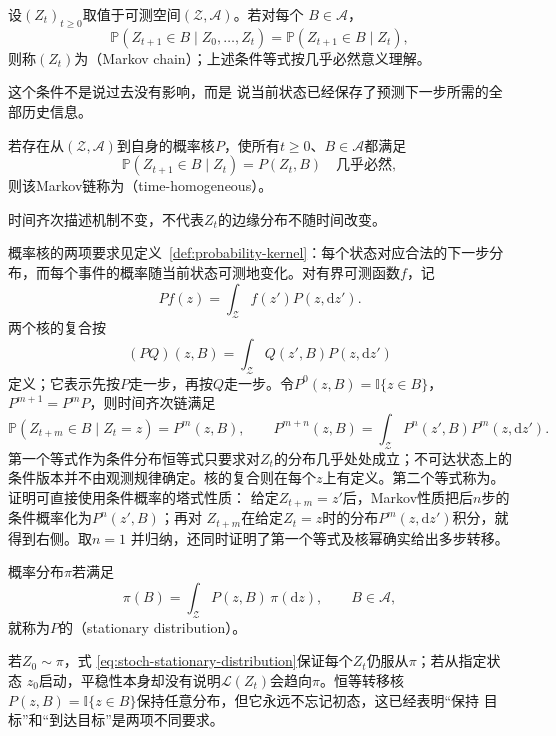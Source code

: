 \begin{definition}[Markov链]
  \label{def:stoch-markov-chain}
设$(Z_t)_{t\geq0}$取值于可测空间$(\mathcal{Z},\mathcal{A})$。若对每个
$B\in\mathcal{A}$，
\[
  \mathbb{P}(Z_{t+1}\in B\mid Z_0,\ldots,Z_t)
  =
  \mathbb{P}(Z_{t+1}\in B\mid Z_t),
\]
则称$(Z_t)$为（Markov chain）；上述条件等式按几乎必然意义理解。
\end{definition}
这个条件不是说过去没有影响，而是
说当前状态已经保存了预测下一步所需的全部历史信息。
\begin{definition}[时间齐次Markov链]
  \label{def:stoch-time-homogeneous-chain}
  若存在从\((\mathcal Z,\mathcal A)\)到自身的概率核\(P\)，使所有\(t\geq0\)、\(B\in\mathcal A\)都满足
  \[ \mathbb P(Z_{t+1}\in B\mid Z_t)=P(Z_t,B)\quad\text{几乎必然}, \]
  则该Markov链称为（time-homogeneous）。
\end{definition}
时间齐次描述机制不变，不代表$Z_t$的边缘分布不随时间改变。

概率核的两项要求见定义~\ref{def:probability-kernel}：每个状态对应合法的下一步分布，而每个事件的概率随当前状态可测地变化。对有界可测函数$f$，记
\[
  Pf(z)=\int_{\mathcal{Z}}f(z')P(z,\mathrm{d}z').
\]
两个核的复合按
\[
  (PQ)(z,B)
  =
  \int_{\mathcal{Z}}Q(z',B)P(z,\mathrm{d}z')
\]
定义；它表示先按$P$走一步，再按$Q$走一步。令$P^0(z,B)=\mathbb{I}\{z\in B\}$，
$P^{m+1}=P^mP$，则时间齐次链满足
\begin{equation}
  \mathbb{P}(Z_{t+m}\in B\mid Z_t=z)=P^m(z,B),
  \qquad
  P^{m+n}(z,B)
  =
  \int_{\mathcal{Z}}P^n(z',B)P^m(z,\mathrm{d}z').
  \label{eq:stoch-chapman-kolmogorov}
\end{equation}
第一个等式作为条件分布恒等式只要求对\(Z_t\)的分布几乎处处成立；不可达状态上的条件版本并不由观测规律确定。核的复合则在每个\(z\)上有定义。第二个等式称为。证明可直接使用条件概率的塔式性质：
给定$Z_{t+m}=z'$后，Markov性质把后$n$步的条件概率化为$P^n(z',B)$；再对
$Z_{t+m}$在给定$Z_t=z$时的分布$P^m(z,\mathrm{d}z')$积分，就得到右侧。取$n=1$
并归纳，还同时证明了第一个等式及核幂确实给出多步转移。

\begin{definition}[平稳分布]
  \label{def:stoch-stationary-distribution}
概率分布$\pi$若满足
\begin{equation}
  \pi(B)=\int_{\mathcal{Z}}P(z,B)\,\pi(\mathrm{d}z),
  \qquad B\in\mathcal{A},
  \label{eq:stoch-stationary-distribution}
\end{equation}
就称为$P$的（stationary distribution）。
\end{definition}
若$Z_0\sim\pi$，式
\eqref{eq:stoch-stationary-distribution}保证每个$Z_t$仍服从$\pi$；若从指定状态
$z_0$启动，平稳性本身却没有说明$\mathcal{L}(Z_t)$会趋向$\pi$。恒等转移核
$P(z,B)=\mathbb{I}\{z\in B\}$保持任意分布，但它永远不忘记初态，这已经表明“保持
目标”和“到达目标”是两项不同要求。

